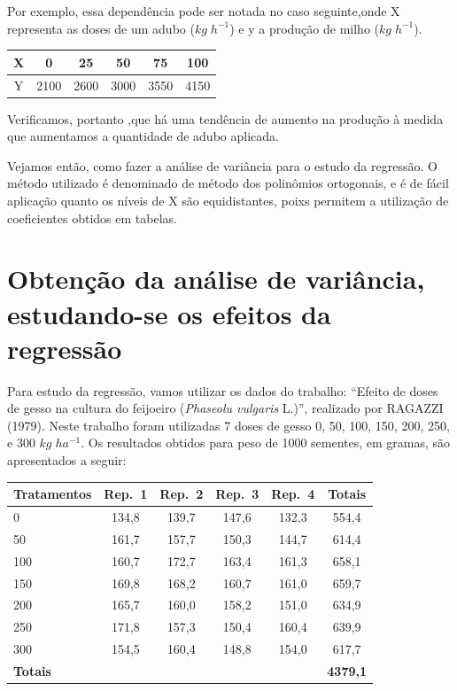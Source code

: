 \documentclass[
]{book}
\begin{document}
Por exemplo, essa dependência pode ser notada no caso seguinte,onde X representa as doses de um adubo (\(kg\;h^{-1}\)) e y a produção de milho (\(kg\;h^{-1}\)).

\begin{longtable}[]{@{}cccccc@{}}
\toprule
X & 0 & 25 & 50 & 75 & 100\tabularnewline
\midrule
\endhead
Y & 2100 & 2600 & 3000 & 3550 & 4150\tabularnewline
\bottomrule
\end{longtable}

Verificamos, portanto ,que há uma tendência de aumento na produção à medida que aumentamos a quantidade de adubo aplicada.

Vejamos então, como fazer a análise de variância para o estudo da regressão. O método utilizado é denominado de método dos polinômios ortogonais, e é de fácil aplicação quanto os níveis de X são equidistantes, poixs permitem a utilização de coeficientes obtidos em tabelas.

\hypertarget{obtenuxe7uxe3o-da-anuxe1lise-de-variuxe2ncia-estudando-se-os-efeitos-da-regressuxe3o}{%
\section{Obtenção da análise de variância, estudando-se os efeitos da regressão}\label{obtenuxe7uxe3o-da-anuxe1lise-de-variuxe2ncia-estudando-se-os-efeitos-da-regressuxe3o}}

Para estudo da regressão, vamos utilizar os dados do trabalho: ``Efeito de doses de gesso na cultura do feijoeiro (\emph{Phaseolu vulgaris} L.)'', realizado por RAGAZZI (1979). Neste trabalho foram utilizadas 7 doses de gesso 0, 50, 100, 150, 200, 250, e 300 \(kg\;ha^{-1}\). Os resultados obtidos para peso de 1000 sementes, em gramas, são apresentados a seguir:

\begin{longtable}[]{@{}lccccc@{}}
\toprule
Tratamentos & Rep.~1 & Rep.~2 & Rep.~3 & Rep.~4 & Totais\tabularnewline
\midrule
\endhead
0 & 134,8 & 139,7 & 147,6 & 132,3 & 554,4\tabularnewline
50 & 161,7 & 157,7 & 150,3 & 144,7 & 614,4\tabularnewline
100 & 160,7 & 172,7 & 163,4 & 161,3 & 658,1\tabularnewline
150 & 169,8 & 168,2 & 160,7 & 161,0 & 659,7\tabularnewline
200 & 165,7 & 160,0 & 158,2 & 151,0 & 634,9\tabularnewline
250 & 171,8 & 157,3 & 150,4 & 160,4 & 639,9\tabularnewline
300 & 154,5 & 160,4 & 148,8 & 154,0 & 617,7\tabularnewline
\textbf{Totais} & & & & & \textbf{4379,1}\tabularnewline
\bottomrule
\end{longtable}
\end{document}
